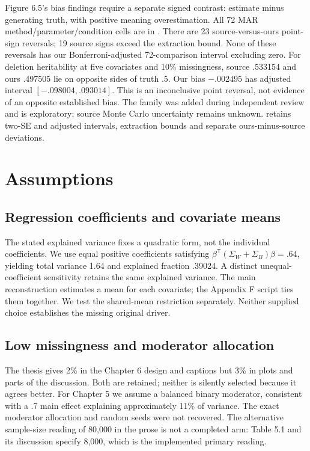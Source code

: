 Figure 6.5's bias findings require a separate signed contrast: estimate minus generating truth, with positive meaning overestimation. All 72 MAR method/parameter/condition cells are in . There are 23 source-versus-ours point-sign reversals; 19 source signs exceed the extraction bound. None of these reversals has our Bonferroni-adjusted 72-comparison interval excluding zero. For deletion heritability at five covariates and 10\% missingness, source .533154 and ours .497505 lie on opposite sides of truth .5. Our bias $-.002495$ has adjusted interval $[-.098004,.093014]$. This is an inconclusive point reversal, not evidence of an opposite established bias. The family was added during independent review and is exploratory; source Monte Carlo uncertainty remains unknown.  retains two-SE and adjusted intervals, extraction bounds and separate ours-minus-source deviations.

\section{Assumptions}
\subsection{Regression coefficients and covariate means}
The stated explained variance fixes a quadratic form, not the individual coefficients. We use equal positive coefficients satisfying $\beta^\mathsf{T}(\Sigma_W+\Sigma_B)\beta=.64$, yielding total variance 1.64 and explained fraction .39024. A distinct unequal-coefficient sensitivity retains the same explained variance. The main reconstruction estimates a mean for each covariate; the Appendix F script ties them together. We test the shared-mean restriction separately. Neither supplied choice establishes the missing original driver.

\subsection{Low missingness and moderator allocation}
The thesis gives 2\% in the Chapter 6 design and captions but 3\% in plots and parts of the discussion. Both are retained; neither is silently selected because it agrees better. For Chapter 5 we assume a balanced binary moderator, consistent with a .7 main effect explaining approximately 11\% of variance. The exact moderator allocation and random seeds were not recovered. The alternative sample-size reading of 80,000 in the prose is not a completed arm: Table 5.1 and its discussion specify 8,000, which is the implemented primary reading.

